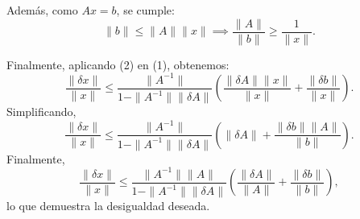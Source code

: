 \begin{homeworkProblem}
\begin{solucion}
    Además, como $Ax = b$, se cumple:
    \begin{equation}
      \|b\| \leq \|A\| \|x\| \implies \frac{\|A\|}{\|b\|} \geq \frac{1}{\|x\|}.
    \end{equation}
    
    Finalmente, aplicando (2) en (1), obtenemos:
    \[
      \frac{\| \delta x \|}{\|x\|} \leq \frac{\| A^{-1} \|}{1 - \| A^{-1} \| \| \delta A \|} \left( \frac{\| \delta A \| \| x \|}{\|x\|} + \frac{\| \delta b \|}{\|x\|} \right).
    \]
    Simplificando,
    \[
      \frac{\| \delta x \|}{\|x\|} \leq \frac{\| A^{-1} \|}{1 - \| A^{-1} \| \| \delta A \|} \left( \| \delta A \| + \frac{\| \delta b \| \| A \|}{\|b\|} \right).
    \]
    Finalmente,
    \[
      \frac{\| \delta x \|}{\|x\|} \leq \frac{\| A^{-1} \| \| A \|}{1 - \| A^{-1} \| \| \delta A \|} \left( \frac{\| \delta A \|}{\|A\|} + \frac{\| \delta b \|}{\|b\|} \right),
    \]
    lo que demuestra la desigualdad deseada.
    \demostrado
  \end{solucion}
\end{homeworkProblem}
